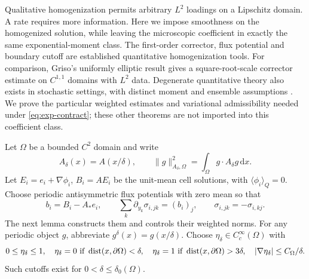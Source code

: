 \documentclass[11pt,a4paper]{article}
\numberwithin{equation}{section}
\theoremstyle{definition}
\theoremstyle{remark}\newtheorem{remark}[theorem]{Remark}
\DeclareMathOperator{\dist}{dist}
\newcommand{\dd}{\,\mathrm dx}
\newcommand{\mean}[2]{\langle #1\rangle_{#2}}
\newcommand{\norm}[1]{\lVert #1\rVert}
\begin{document}
Qualitative homogenization permits arbitrary \(L^2\) loadings on a
Lipschitz domain. A rate requires more information. Here we impose
smoothness on the homogenized solution, while leaving the microscopic
coefficient in exactly the same exponential-moment class.
The first-order corrector, flux potential and boundary cutoff are
established quantitative homogenization tools. For comparison,
Griso's uniformly elliptic result
\cite[Theorem~4.1 in the cited preprint]{Griso2004} gives a
square-root-scale corrector estimate on \(C^{1,1}\) domains with
\(L^2\) data. Degenerate quantitative theory also exists in stochastic
settings, with distinct moment and ensemble assumptions
\cite[Definition~1.1 and Section~2]{BellaKniely2024}.
We prove the particular weighted estimates and variational
admissibility needed under \eqref{eq:exp-contract}; these other
theorems are not imported into this coefficient class.

Let \(\Omega\) be a bounded \(C^2\) domain and write
\[
 A_\delta(x)=A(x/\delta),\qquad
 \norm g_{A_\delta,\Omega}^2=\int_\Omega g\cdot A_\delta g\dd .
\]
Let \(E_i=e_i+\nabla\phi_i\), \(B_i=AE_i\) be the unit-mean
cell solutions, with \(\mean{\phi_i}Q=0\). Choose periodic
antisymmetric flux potentials with zero mean so that
\begin{equation}\label{eq:flux-potential}
 b_i=B_i-A_*e_i,\qquad
 \sum_k\partial_{y_k}\sigma_{i,jk}=(b_i)_j,\qquad
 \sigma_{i,jk}=-\sigma_{i,kj}.
\end{equation}
The next lemma constructs them and controls their weighted norms.
For any periodic object \(g\), abbreviate \(g^\delta(x)=g(x/\delta)\).
Choose \(\eta_\delta\in C_c^\infty(\Omega)\) with
\[
 0\leq\eta_\delta\leq1,\quad
 \eta_\delta=0\ \hbox{if }\dist(x,\partial\Omega)<\delta,\quad
 \eta_\delta=1\ \hbox{if }\dist(x,\partial\Omega)>3\delta,\quad
 |\nabla\eta_\delta|\leq C_\Omega/\delta .
\]
Such cutoffs exist for \(0<\delta\leq\delta_0(\Omega)\).
\end{document}
